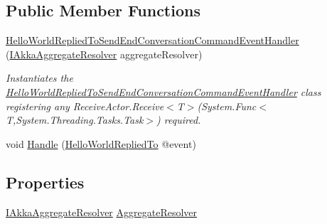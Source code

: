 \subsection*{Public Member Functions}
\begin{DoxyCompactItemize}
\item 
\hyperlink{classCqrs_1_1Akka_1_1Tests_1_1Unit_1_1Events_1_1Handlers_1_1HelloWorldRepliedToSendEndConversationCommandEventHandler_a0befe6ff4cac9d9c4c6898320d4826ab}{Hello\+World\+Replied\+To\+Send\+End\+Conversation\+Command\+Event\+Handler} (\hyperlink{interfaceCqrs_1_1Akka_1_1Domain_1_1IAkkaAggregateResolver}{I\+Akka\+Aggregate\+Resolver} aggregate\+Resolver)
\begin{DoxyCompactList}\small\item\em Instantiates the \hyperlink{classCqrs_1_1Akka_1_1Tests_1_1Unit_1_1Events_1_1Handlers_1_1HelloWorldRepliedToSendEndConversationCommandEventHandler}{Hello\+World\+Replied\+To\+Send\+End\+Conversation\+Command\+Event\+Handler} class registering any Receive\+Actor.\+Receive$<$\+T$>$(\+System.\+Func$<$\+T,\+System.\+Threading.\+Tasks.\+Task$>$) required. \end{DoxyCompactList}\item 
void \hyperlink{classCqrs_1_1Akka_1_1Tests_1_1Unit_1_1Events_1_1Handlers_1_1HelloWorldRepliedToSendEndConversationCommandEventHandler_af25c19f15c65e673f91eef4b1643c27f}{Handle} (\hyperlink{classCqrs_1_1Akka_1_1Tests_1_1Unit_1_1Events_1_1HelloWorldRepliedTo}{Hello\+World\+Replied\+To} @event)
\end{DoxyCompactItemize}
\subsection*{Properties}
\begin{DoxyCompactItemize}
\item 
\hyperlink{interfaceCqrs_1_1Akka_1_1Domain_1_1IAkkaAggregateResolver}{I\+Akka\+Aggregate\+Resolver} \hyperlink{classCqrs_1_1Akka_1_1Tests_1_1Unit_1_1Events_1_1Handlers_1_1HelloWorldRepliedToSendEndConversationCommandEventHandler_a627ab1180114304102fa7b11ab838fac}{Aggregate\+Resolver}
\end{DoxyCompactItemize}


